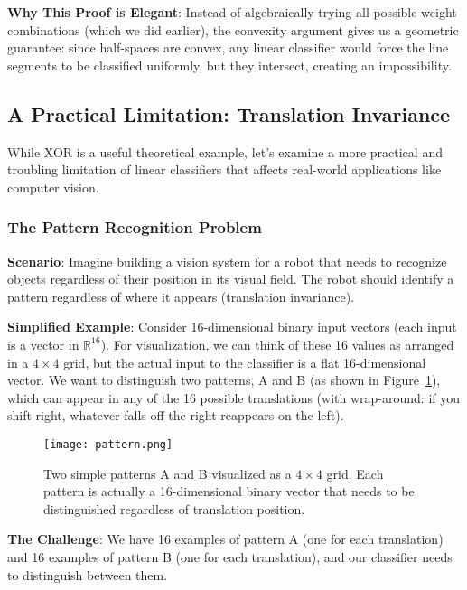 \textbf{Why This Proof is Elegant}: Instead of algebraically trying all possible weight combinations (which we did earlier), the convexity argument gives us a geometric guarantee: since half-spaces are convex, any linear classifier would force the line segments to be classified uniformly, but they intersect, creating an impossibility.

\subsection{A Practical Limitation: Translation Invariance}

While XOR is a useful theoretical example, let's examine a more practical and troubling limitation of linear classifiers that affects real-world applications like computer vision.

\subsubsection{The Pattern Recognition Problem}

\textbf{Scenario}: Imagine building a vision system for a robot that needs to recognize objects regardless of their position in its visual field. The robot should identify a pattern regardless of where it appears (translation invariance).

\textbf{Simplified Example}: Consider 16-dimensional binary input vectors (each input is a vector in $\mathbb{R}^{16}$). For visualization, we can think of these 16 values as arranged in a $4 \times 4$ grid, but the actual input to the classifier is a flat 16-dimensional vector. We want to distinguish two patterns, A and B (as shown in Figure~\ref{fig:pattern}), which can appear in any of the 16 possible translations (with wrap-around: if you shift right, whatever falls off the right reappears on the left).

\begin{figure}[h]
    \centering
    \texttt{[image: pattern.png]}
    \caption{Two simple patterns A and B visualized as a $4 \times 4$ grid. Each pattern is actually a 16-dimensional binary vector that needs to be distinguished regardless of translation position.}
    \label{fig:pattern}
\end{figure}

\textbf{The Challenge}: We have 16 examples of pattern A (one for each translation) and 16 examples of pattern B (one for each translation), and our classifier needs to distinguish between them.

